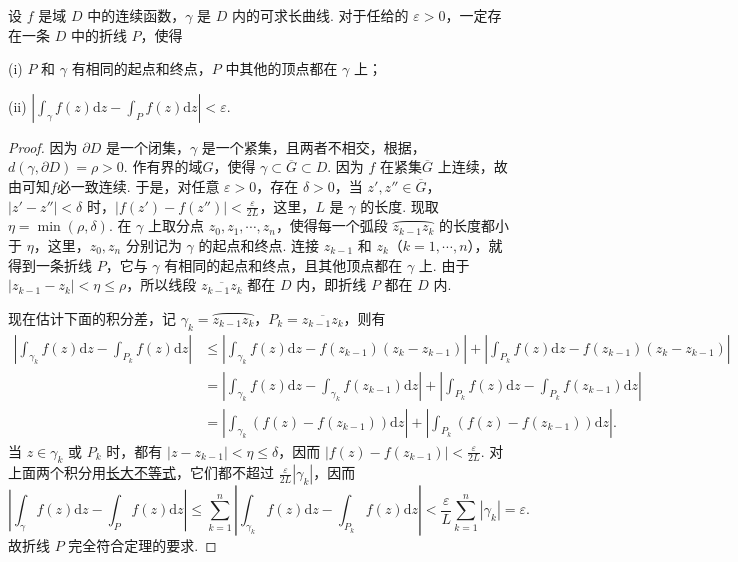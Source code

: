 \documentclass[../../main.tex]{subfiles}
\begin{document}
\begin{lemma}\label{lemma:引理:3.2.2}
设 \( f \) 是域 \( D \) 中的连续函数，\( \gamma \) 是 \( D \) 内的可求长曲线. 对于任给的 \( \varepsilon > 0 \)，一定存在一条 \( D \) 中的折线 \( P \)，使得

(i) \( P \) 和 \( \gamma \) 有相同的起点和终点，\( P \) 中其他的顶点都在 \( \gamma \) 上；

(ii) \( \left| \int_\gamma f(z)\mathrm{d}z - \int_P f(z)\mathrm{d}z \right| < \varepsilon \).
\end{lemma}
\begin{proof}
因为 \( \partial D \) 是一个闭集，\( \gamma \) 是一个紧集，且两者不相交，根据，\( d(\gamma, \partial D) = \rho > 0 \). 作有界的域\( G \)，使得 \( \gamma \subset \overline{G} \subset D \). 因为 \( f \) 在紧集\( \overline{G} \) 上连续，故由可知$f$必一致连续. 于是，对任意 \( \varepsilon > 0 \)，存在 \( \delta > 0 \)，当 \( z', z'' \in \overline{G} \)，\( |z' - z''| < \delta \) 时，\( |f(z') - f(z'')| < \frac{\varepsilon}{2L} \)，这里，\( L \) 是 \( \gamma \) 的长度. 现取 \( \eta = \min(\rho, \delta) \). 在 \( \gamma \) 上取分点 \( z_0, z_1, \cdots, z_n \)，使得每一个弧段 \( \wideparen{z_{k - 1}z_k} \) 的长度都小于 \( \eta \)，这里，\( z_0, z_n \) 分别记为 \( \gamma \) 的起点和终点. 连接 \( z_{k - 1} \) 和 \( z_k \)（\( k = 1, \cdots, n \)），就得到一条折线 \( P \)，它与 \( \gamma \) 有相同的起点和终点，且其他顶点都在 \( \gamma \) 上. 由于 \( |z_{k - 1} - z_k| < \eta \leqslant \rho \)，所以线段 \( \overline{z_{k - 1}z_k} \) 都在 \( D \) 内，即折线 \( P \) 都在 \( D \) 内.

现在估计下面的积分差，记 \( \gamma_k = \wideparen{z_{k - 1}z_k} \)，\( P_k = \overline{z_{k - 1}z_k} \)，则有
\begin{align*}
\left| \int_{\gamma_k} f(z)\mathrm{d}z - \int_{P_k} f(z)\mathrm{d}z \right|
&\leqslant \left| \int_{\gamma_k} f(z)\mathrm{d}z - f(z_{k - 1})(z_k - z_{k - 1}) \right|
+ \left| \int_{P_k} f(z)\mathrm{d}z - f(z_{k - 1})(z_k - z_{k - 1}) \right|
\\
&= \left| \int_{\gamma_k} f(z)\mathrm{d}z - \int_{\gamma_k} f(z_{k - 1})\mathrm{d}z \right| + \left| \int_{P_k} f(z)\mathrm{d}z - \int_{P_k} f(z_{k - 1})\mathrm{d}z \right|
\\
&= \left| \int_{\gamma_k} (f(z) - f(z_{k - 1}))\mathrm{d}z \right| + \left| \int_{P_k} (f(z) - f(z_{k - 1}))\mathrm{d}z \right|.
\end{align*}
当 \( z \in \gamma_k \) 或 \( P_k \) 时，都有 \( |z - z_{k - 1}| < \eta \leqslant \delta \)，因而 \( |f(z) - f(z_{k - 1})| < \frac{\varepsilon}{2L} \). 对上面两个积分用\hyperref[proposition:长大不等式]{长大不等式}，它们都不超过 \( \frac{\varepsilon}{2L}|\gamma_k| \)，因而
\[
\left| \int_\gamma f(z)\mathrm{d}z - \int_P f(z)\mathrm{d}z \right| \leqslant \sum_{k = 1}^n \left| \int_{\gamma_k} f(z)\mathrm{d}z - \int_{P_k} f(z)\mathrm{d}z \right|
< \frac{\varepsilon}{L} \sum_{k = 1}^n |\gamma_k|
= \varepsilon.
\]
故折线 \( P \) 完全符合定理的要求.
\end{proof}
\end{document}
